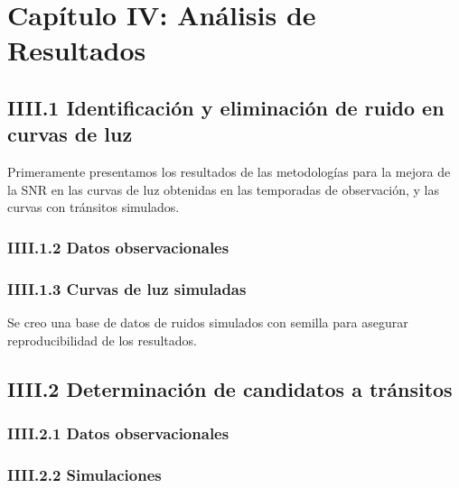\chapter*{\textbf{Capítulo IV: Análisis de Resultados}}

\section*{IIII.1 Identificación y eliminación de ruido en curvas de luz}

Primeramente presentamos los resultados de las metodologías para la mejora de la SNR en las curvas de luz obtenidas en las temporadas de observación, y las curvas con tránsitos simulados.

\subsection*{IIII.1.2 Datos observacionales}




\subsection*{IIII.1.3 Curvas de luz simuladas}

Se creo una base de datos de ruidos simulados con semilla para asegurar reproducibilidad de los resultados. 




\section*{IIII.2 Determinación de candidatos a tránsitos}

\subsection*{IIII.2.1 Datos observacionales}

\subsection*{IIII.2.2 Simulaciones}


